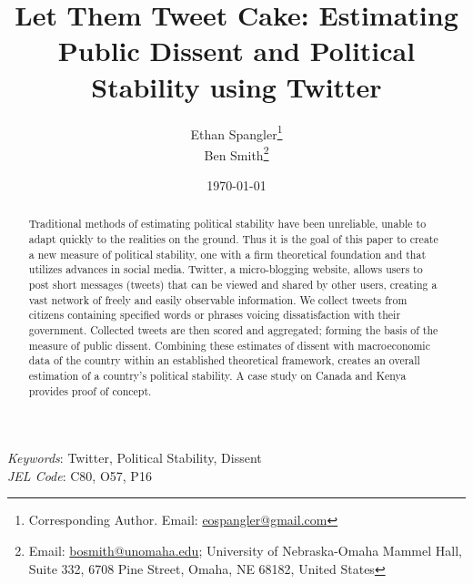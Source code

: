 \documentclass[12pt]{article}
\begin{document}
  


\begin{titlepage}




\title{Let Them Tweet Cake: Estimating Public Dissent and Political Stability using Twitter}



\author{Ethan Spangler\thanks{Corresponding Author. Email: {\href{mailto:eospangler@gmail.com}{eospangler@gmail.com}}} \\ %
Ben Smith\thanks{Email: {\href{mailto:bosmith@unomaha.edu}{bosmith@unomaha.edu}}; University of Nebraska-Omaha Mammel Hall, Suite 332, 6708 Pine Street, Omaha, NE 68182, United States}}



\date{\today}

\maketitle

\begin{abstract}
\noindent Traditional methods of estimating political stability have been unreliable, unable to adapt quickly to the realities on the ground. Thus it is the goal of this paper to create a new measure of political stability, one with a firm theoretical foundation and that utilizes advances in social media. Twitter, a micro-blogging website, allows users to post short messages (tweets) that can be viewed and shared by other users, creating a vast network of freely and easily observable information. We collect tweets from citizens containing specified words or phrases voicing dissatisfaction with their government. Collected tweets are then scored and aggregated; forming the basis of the measure of public dissent. Combining these estimates of dissent with macroeconomic data of the country within an established theoretical framework, creates an overall estimation of a country's political stability. A case study on Canada and Kenya provides proof of concept.
\end{abstract}

\noindent \textit{Keywords}: Twitter, Political Stability, Dissent \\

\noindent \textit{JEL Code}: C80, O57, P16




\end{titlepage}
\end{document}
